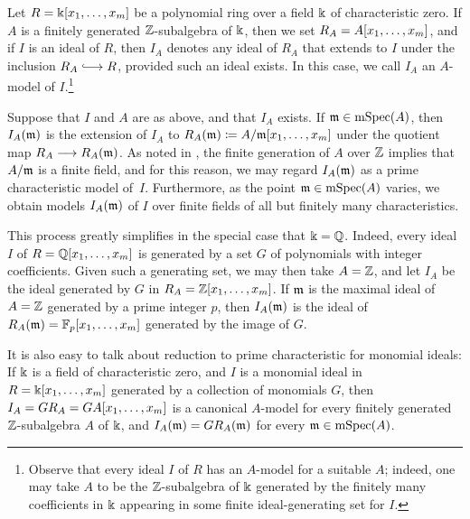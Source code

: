 \documentclass{amsart}
\begin{document}
\begin{remark}
   \label{reduction: R}
   Let $R = \Bbbk[x_1, \ldots, x_m]$ be a polynomial ring over a field $\Bbbk$ of characteristic zero.
   If $A$ is a finitely generated $\mathbb{Z}$-subalgebra of $\Bbbk$, then we set $R_A=A[x_1, \ldots, x_m]$, and if $I$ is an ideal of $R$, then $I_A$ denotes any ideal of $R_A$ that extends to $I$ under the inclusion $R_A \hooklongrightarrow R$, provided such an ideal exists.
   In this case, we call $I_A$ an $A$-model of $I$.\footnote{Observe that every ideal $I$ of $R$ has an $A$-model for a suitable $A$; indeed, one may take $A$ to be the $\mathbb{Z}$-subalgebra of $\Bbbk$ generated by the finitely many coefficients in $\Bbbk$ appearing in some finite ideal-generating set for $I$.}

   Suppose that $I$ and $A$ are as above, and that $I_A$ exists.
   If $\mathfrak{m} \in \operatorname{mSpec}(A)$, then $I_A(\mathfrak{m})$ is the extension of $I_A$ to $R_{A}(\mathfrak{m}) \coloneqq A/\mathfrak{m}[x_1, \ldots, x_m]$ under the quotient map $R_A \longrightarrow R_A(\mathfrak{m})$.
   As noted in , the finite generation of $A$ over $\mathbb{Z}$ implies that $A/\mathfrak{m}$ is a finite field, and for this reason, we may regard $I_A(\mathfrak{m})$ as a prime characteristic model of~$I$.
   Furthermore, as the point $\mathfrak{m} \in \operatorname{mSpec}(A)$ varies, we obtain models $I_A(\mathfrak{m})$ of $I$ over finite fields of all but finitely many characteristics.
\end{remark}

This process greatly simplifies in the special case that $\Bbbk=\mathbb{Q}$.  Indeed, every ideal $I$ of $R=\mathbb{Q}[x_1, \ldots, x_m]$ is generated by a set $G$ of polynomials with integer coefficients.  Given such a generating set, we may then take $A=\mathbb{Z}$, and let $I_A$ be the ideal generated by $G$ in $R_A=\mathbb{Z}[x_1, \ldots, x_m]$.  If  $\mathfrak{m}$ is the maximal ideal of $A=\mathbb{Z}$ generated by a prime integer $p$, then $I_A(\mathfrak{m})$ is the ideal of $R_A(\mathfrak{m}) = \mathbb{F}_p[x_1, \ldots, x_m]$  generated by the image of $G$.

It is also easy to talk about reduction to prime characteristic for monomial ideals:
If $\Bbbk$ is a field of characteristic zero, and $I$ is a monomial ideal in $R=\Bbbk[x_1, \ldots, x_m]$ generated by a collection of monomials $G$, then $I_A = GR_A = GA[x_1, \ldots, x_m]$ is a canonical $A$-model for every finitely generated $\mathbb{Z}$-subalgebra $A$ of $\Bbbk$, and $I_A(\mathfrak{m}) = GR_A(\mathfrak{m})$ for every $\mathfrak{m} \in \operatorname{mSpec}(A)$.
\end{document}
